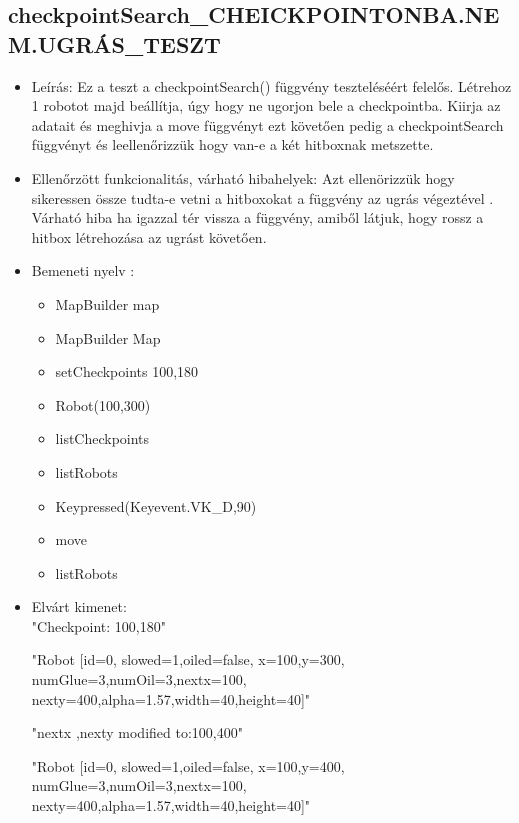 \subsection{checkpointSearch\_CHEICKPOINTONBA.NEM.UGRÁS\_TESZT}
\begin{itemize}
	\item Leírás: Ez a teszt a checkpointSearch() függvény teszteléséért felelős.
			Létrehoz 1 robotot majd beállítja, úgy hogy ne ugorjon bele a checkpointba.
			Kiirja az adatait  és meghivja a move függvényt ezt követően pedig a checkpointSearch függvényt és leellenőrizzük hogy van-e a két hitboxnak metszette.\newline
	\item Ellenőrzött funkcionalitás, várható hibahelyek: Azt ellenörizzük hogy sikeressen össze tudta-e vetni a hitboxokat a függvény az ugrás                     végeztével .
	        Várható hiba ha igazzal tér vissza a függvény, amiből látjuk, hogy rossz a hitbox létrehozása  az ugrást követően.
	\item Bemeneti nyelv :
		\begin{itemize}
\item MapBuilder map
        \item MapBuilder Map
        \item setCheckpoints 100,180
		\item Robot(100,300)
		\item listCheckpoints
		\item listRobots
		\item Keypressed(Keyevent.VK\_D,90)
		\item move
		\item listRobots
		\end{itemize}

	\item Elvárt kimenet: \\
	    "Checkpoint: 100,180"\newline
	    
		"Robot [id=0,  slowed=1,oiled=false, x=100,y=300, 
		\\numGlue=3,numOil=3,nextx=100,
		\\nexty=400,alpha=1.57,width=40,height=40]"\newline
		
		"nextx ,nexty modified to:100,400"\newline
	
		 "Robot [id=0,  slowed=1,oiled=false, x=100,y=400, 
		\\numGlue=3,numOil=3,nextx=100,
		\\nexty=400,alpha=1.57,width=40,height=40]"\newline
	
\end{itemize}

